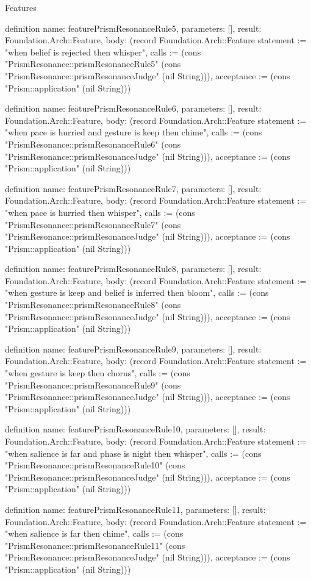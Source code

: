 \begin{lexlean}{Features}
\begin{semanticmodule}
definition{
  name: featurePrismResonanceRule5,
  parameters: [],
  result: Foundation.Arch::Feature,
  body: (record Foundation.Arch::Feature {statement := "when belief is rejected then whisper", calls := (cons "PrismResonance::prismResonanceRule5" (cons "PrismResonance::prismResonanceJudge" (nil String))), acceptance := (cons "Prism::application" (nil String))})
}

definition{
  name: featurePrismResonanceRule6,
  parameters: [],
  result: Foundation.Arch::Feature,
  body: (record Foundation.Arch::Feature {statement := "when pace is hurried and gesture is keep then chime", calls := (cons "PrismResonance::prismResonanceRule6" (cons "PrismResonance::prismResonanceJudge" (nil String))), acceptance := (cons "Prism::application" (nil String))})
}

definition{
  name: featurePrismResonanceRule7,
  parameters: [],
  result: Foundation.Arch::Feature,
  body: (record Foundation.Arch::Feature {statement := "when pace is hurried then whisper", calls := (cons "PrismResonance::prismResonanceRule7" (cons "PrismResonance::prismResonanceJudge" (nil String))), acceptance := (cons "Prism::application" (nil String))})
}

definition{
  name: featurePrismResonanceRule8,
  parameters: [],
  result: Foundation.Arch::Feature,
  body: (record Foundation.Arch::Feature {statement := "when gesture is keep and belief is inferred then bloom", calls := (cons "PrismResonance::prismResonanceRule8" (cons "PrismResonance::prismResonanceJudge" (nil String))), acceptance := (cons "Prism::application" (nil String))})
}

definition{
  name: featurePrismResonanceRule9,
  parameters: [],
  result: Foundation.Arch::Feature,
  body: (record Foundation.Arch::Feature {statement := "when gesture is keep then chorus", calls := (cons "PrismResonance::prismResonanceRule9" (cons "PrismResonance::prismResonanceJudge" (nil String))), acceptance := (cons "Prism::application" (nil String))})
}

definition{
  name: featurePrismResonanceRule10,
  parameters: [],
  result: Foundation.Arch::Feature,
  body: (record Foundation.Arch::Feature {statement := "when salience is far and phase is night then whisper", calls := (cons "PrismResonance::prismResonanceRule10" (cons "PrismResonance::prismResonanceJudge" (nil String))), acceptance := (cons "Prism::application" (nil String))})
}

definition{
  name: featurePrismResonanceRule11,
  parameters: [],
  result: Foundation.Arch::Feature,
  body: (record Foundation.Arch::Feature {statement := "when salience is far then chime", calls := (cons "PrismResonance::prismResonanceRule11" (cons "PrismResonance::prismResonanceJudge" (nil String))), acceptance := (cons "Prism::application" (nil String))})
}


\end{semanticmodule}
\end{lexlean}
